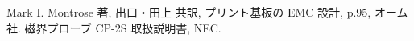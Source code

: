 \documentclass[
  a4paper,  %
  11pt,     %
]{ltjsarticle}
\begin{document}
\begin{thebibliography}{9}
 Mark I. Montrose 著, 出口・田上 共訳, プリント基板の EMC 設計, p.95, オーム社.
 磁界プローブ CP-2S 取扱説明書, NEC.
\end{thebibliography}
\end{document}
